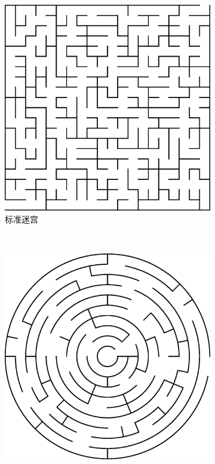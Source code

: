 \documentclass[cs4size,a4paper,adobefonts]{ctexart}
\begin{document}
\begin{figure}[htbp]
  \centering
  \begin{subfigure}[c]{0.31\textwidth}
    \centering
    \includegraphics[width=\textwidth]{rectMaze}
    \caption{标准迷宫}\label{fig:rectMaze}
  \end{subfigure}
  ~
  \begin{subfigure}[c]{0.31\textwidth}
    \centering
    \includegraphics[width=\textwidth]{diskMaze}

\end{subfigure}
\end{figure}
\end{document}
